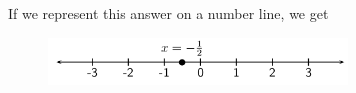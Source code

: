       
      \label{m39254*id157620}If we represent this answer on a number line, we get\par 
      \label{m39254*id157626}
        
    \setcounter{subfigure}{0}


	\begin{figure}[H] %
    \begin{center}
    \label{m39254*id157630!!!underscore!!!media}\label{m39254*id157630!!!underscore!!!printimage}\includegraphics[width=300px]{col11306.imgs/m39254_MG10C10_001.png} %
        
      \vspace{2pt}
    \vspace{.1in}
    
    \end{center}

 \end{figure}   

    \addtocounter{footnote}{-0}
    
